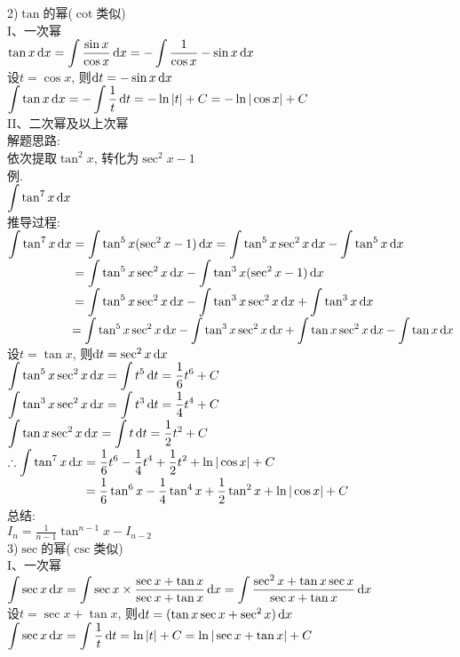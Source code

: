 2)$\tan$的幂($\cot$类似)\\
I、一次幂\\
$\displaystyle\tan x\mathop{}\!\mathrm{d} x=\int\frac{\sin x}{\cos x}\mathop{}\!\mathrm{d} x=-\int\frac{1}{\cos x}-\sin x\mathop{}\!\mathrm{d} x$\\
设$t=\cos x$, 则$\mathop{}\!\mathrm{d} t=-\sin x\mathop{}\!\mathrm{d} x$\\
$\displaystyle\int\tan x\mathop{}\!\mathrm{d} x=-\int\frac{1}{t}\mathop{}\!\mathrm{d} t=-\ln|t|+C=-\ln|\cos x|+C$\\

II、二次幂及以上次幂\\
解题思路:\\
依次提取$\tan^2x$, 转化为$\sec^2x-1$\\
例.\\
\phantom{例}$\displaystyle\int\tan^7x\mathop{}\!\mathrm{d} x$\\
推导过程:\\
$\displaystyle\int\tan^7x\mathop{}\!\mathrm{d} x=\int\tan^5x(\sec^2x-1)\mathop{}\!\mathrm{d} x=\int\tan^5x\sec^2x\mathop{}\!\mathrm{d} x-\int\tan^5x\mathop{}\!\mathrm{d} x$\\
$\displaystyle\phantom{\int\tan^7x\dif x}=\int\tan^5x\sec^2x\dif x-\int\tan^3x(\sec^2x-1)\dif x$\\
$\displaystyle\phantom{\int\tan^7x\dif x}=\int\tan^5x\sec^2x\dif x-\int\tan^3x\sec^2x\dif x+\int\tan^3x\dif x$\\
$\displaystyle\phantom{\int\tan^7x\dif x}=\int\tan^5x\sec^2x\dif x-\int\tan^3x\sec^2x\dif x+\int\tan x\sec^2x\dif x-\int\tan x\dif x$\\
设$t=\tan x$, 则$\mathop{}\!\mathrm{d} t=\sec^2x\mathop{}\!\mathrm{d} x$\\
$\displaystyle\int\tan^5x\sec^2x\mathop{}\!\mathrm{d} x=\int t^5\mathop{}\!\mathrm{d} t=\frac{1}{6}t^6+C$\\
$\displaystyle\int\tan^3x\sec^2x\mathop{}\!\mathrm{d} x=\int t^3\mathop{}\!\mathrm{d} t=\frac{1}{4}t^4+C$\\
$\displaystyle\int\tan x\sec^2x\mathop{}\!\mathrm{d} x=\int t\mathop{}\!\mathrm{d} t=\frac{1}{2}t^2+C$\\
$\displaystyle\therefore\int\tan^7x\mathop{}\!\mathrm{d} x=\frac{1}{6}t^6-\frac{1}{4}t^4+\frac{1}{2}t^2+\ln|\cos x|+C$\\
$\displaystyle\phantom{\therefore\int\tan^7x\dif x}=\frac{1}{6}\tan^6x-\frac{1}{4}\tan^4x+\frac{1}{2}\tan^2x+\ln|\cos x|+C$\\
总结:\\
$\displaystyle I_n=\frac{1}{n-1}\tan^{n-1}x-I_{n-2}$\\

3)$\sec$的幂($\csc$类似)\\
I、一次幂\\
$\displaystyle\int\sec x\mathop{}\!\mathrm{d} x=\int\sec x\times\frac{\sec x+\tan x}{\sec x+\tan x}\mathop{}\!\mathrm{d} x=\int\frac{\sec^2x+\tan x\sec x}{\sec x+\tan x}\mathop{}\!\mathrm{d} x$\\
设$t=\sec x+\tan x$, 则$\mathop{}\!\mathrm{d} t=(\tan x\sec x+\sec^2x)\mathop{}\!\mathrm{d} x$\\
$\displaystyle\int\sec x\mathop{}\!\mathrm{d} x=\int\frac{1}{t}\mathop{}\!\mathrm{d} t=\ln|t|+C=\ln|\sec x+\tan x|+C$\\

